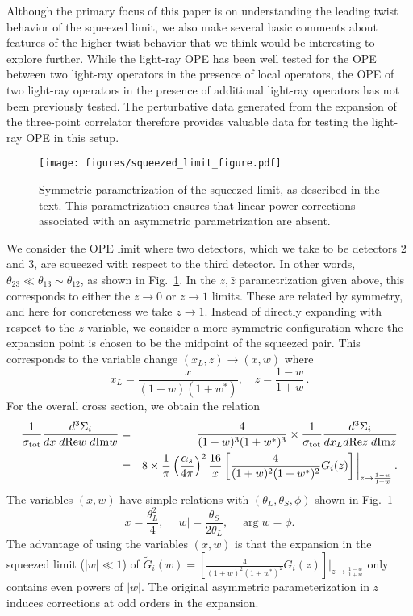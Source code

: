 \documentclass[letterpaper,11pt]{article}
\def\beq{\begin{equation}}
\def\eeq{\end{equation}}
\def\bea{\begin{eqnarray}}
\def\eea{\end{eqnarray}}
\def\nn{{\nonumber}}
\newcommand{\abs}[1]{\lvert#1\rvert}
\def\beq{\begin{equation}}
\def\eeq{\end{equation}}
\begin{document}
Although the primary focus of this paper is on understanding the leading twist behavior of the squeezed limit, we also make several basic comments about features of the higher twist behavior that we think would be interesting to explore further. While the light-ray OPE has been well tested for the OPE between two light-ray operators in the presence of local operators, the OPE of two light-ray operators in the presence of additional light-ray operators has not been previously tested. The perturbative data generated from the expansion of the three-point correlator therefore provides valuable data for testing the light-ray OPE in this setup. 

\begin{figure}
\begin{center}
\texttt{[image: figures/squeezed\_limit\_figure.pdf]}
\caption{Symmetric parametrization of the squeezed limit, as described in the text. This parametrization ensures that linear power corrections associated with an asymmetric parametrization are absent.}
\label{squeezed_fig}
\end{center}
\end{figure}

We consider the OPE limit where two detectors, which we take to be detectors $2$ and $3$, are squeezed with respect to the third detector. In other words, $\theta_{23}\ll \theta_{13}\sim \theta_{12}$, as shown in Fig.~\ref{squeezed_fig}. In the $z, \bar z$ parametrization given above, this corresponds to either the $z\to 0$ or $z\to 1$ limits. These are related by symmetry, and here for concreteness we take $z\to 1$. Instead of directly expanding with respect to the $z$ variable, we consider a more symmetric configuration where the expansion point is chosen to be the midpoint of the squeezed pair. This corresponds to the variable change $(x_L, z)\to(x, w)$ where
\beq
x_L=\frac{x}{(1+w)(1+w^*)},\quad z=\frac{1-w}{1+w}\,.
\eeq
For the overall cross section, we obtain the relation
\bea
\frac{1}{\sigma_{\rm tot}}\frac{d^3\Sigma_i}{d x\; d \mathrm{Re} w \;d\mathrm{Im}w}&=&\frac{4}{(1+w)^3 (1+w^*)^3}\times \frac{1}{\sigma_{\rm tot}}\frac{d^3\Sigma_i}{d x_L d \mathrm{Re} z \;d\mathrm{Im}z}
\nn
\\
&=&8\times \frac{1}{\pi}\left(\frac{\alpha_s}{4\pi}\right)^2 \frac{16}{x} \left[\frac{4}{(1+w)^2(1+w^*)^2}G_i(z)\right]\bigg\vert_{z\to\frac{1-w}{1+w}}\,.
\eea
The variables $(x, w)$ have simple relations with $(\theta_L, \theta_S,\phi)$ shown in Fig.~\ref{squeezed_fig} 
\beq
x=\frac{\theta_L^2}{4},\quad \abs{w}=\frac{\theta_S}{2\theta_L}, \quad \arg{w}=\phi.
\eeq
The advantage of using the variables $(x, w)$ is that the expansion in the squeezed limit ($\abs{w}\ll 1$) of $\displaystyle \widetilde{G}_i(w)= \left[\frac{4}{(1+w)^2(1+w^*)^2}G_i(z)\right]\bigg\vert_{z\to\frac{1-w}{1+w}}$ only contains even powers of $\abs{w}$. The original asymmetric parameterization in $z$ induces corrections at odd orders in the expansion.
\end{document}
